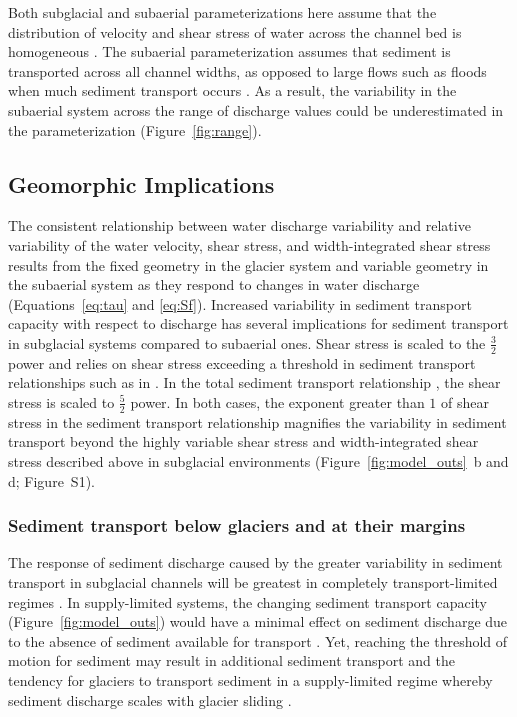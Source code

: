 \documentclass[11pt]{article}
\begin{document}
\begin{spacing}{1}
  Both subglacial and subaerial parameterizations here assume that the distribution of velocity and shear stress of water across the channel bed is homogeneous \citep[Section~\ref{sect:sub_mode}~and~\ref{sect:fluv}][]{wainwright2015}. 
  The subaerial parameterization assumes that sediment is transported across all channel widths, as opposed to large flows such as floods when much sediment transport occurs \citep{wolman1960}.
  As a result, the variability in the subaerial system across the range of discharge values could be underestimated in the parameterization (Figure~\ref{fig:range}).
  
  
  
  \subsection{Geomorphic Implications}
  \label{sect:GI}
  The consistent relationship between water discharge variability and relative variability of the water velocity, shear stress, and width-integrated shear stress results from the fixed geometry in the glacier system and variable geometry in the subaerial system as they respond to changes in water discharge (Equations~\ref{eq:tau} and \ref{eq:Sf}).
  Increased variability in sediment transport capacity with respect to discharge has several implications for sediment transport in subglacial systems compared to subaerial ones.
  Shear stress is scaled to the $\frac{3}{2}$ power and relies on shear stress exceeding a threshold in sediment transport relationships  such as in \citet{meyer1948}.
  In the total sediment transport relationship \citet{engelund1967}, the shear stress is scaled to $\frac{5}{2}$ power.
  In both cases, the exponent greater than $1$ of shear stress in the sediment transport relationship magnifies the variability in sediment transport beyond the highly variable shear stress and width-integrated shear stress described above in subglacial environments (Figure~\ref{fig:model_outs}\, b and d; Figure~S1).

  \subsubsection{Sediment transport below glaciers and at their margins}
  
  The response of sediment discharge caused by the greater variability in sediment transport in subglacial channels will be greatest in completely transport-limited regimes \citep[e.g.][]{kasmalkar2019}.
  In supply-limited systems, the changing sediment transport capacity (Figure~\ref{fig:model_outs}) would have a minimal effect on sediment discharge due to the absence of sediment available for transport \citep{delaney2019}.
  Yet, reaching the threshold of motion for sediment  may result in additional sediment transport and the tendency for glaciers to transport sediment in a supply-limited regime whereby sediment discharge scales with glacier sliding  \citep[e.g.][]{herman2015,koppes2015}.
  

\end{spacing}
\end{document}
